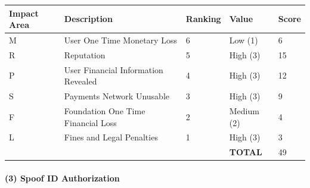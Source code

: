 \documentclass[a4paper,12pt]{article} %
\begin{document}
{\begin{center}
\begin{tabular}{ | l | l | l | l | l |}
  \hline
  \textbf{Impact Area} & \textbf{Description} & \textbf{Ranking} & \textbf{Value} & \textbf{Score}
  \\ \hline
  M & User One Time Monetary Loss			& 6	& Low (1)		& 6
  \\ \hline
  R & Reputation		& 5	& High (3)		& 15
  \\ \hline
  P & User Financial Information Revealed		& 4	& High (3)		& 12
  \\ \hline
  S & Payments Network Unusable					& 3	& High (3)		& 9
  \\ \hline
  F & Foundation One Time Financial Loss	& 2	& Medium (2)	& 4
  \\ \hline
  L & Fines and Legal Penalties						& 1	& High (3)		& 3
  \\ \hline
  & & & \textbf{TOTAL} & 49
  \\ \hline
\end{tabular}
\end{center}
\label{tab:severityBruteForceIdAddressLookup}

\paragraph{(3) Spoof ID Authorization }

}
\end{document}
